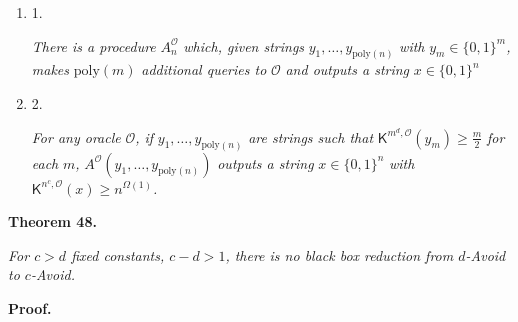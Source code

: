 \begin{enumerate}


\item[] 
1. 


\emph{There is a procedure }$A^{\mathcal{O}}_{n}$\emph{ which, given strings }$y_{1},\ldots,y_{\mathrm{poly}(n)}$\emph{ with }$y_{m}\in\{0,1\}^{m}$\emph{, makes }$\mathrm{poly}(m)$\emph{ additional queries to }$\mathcal{O}$\emph{ and outputs a string }$x\in\{0,1\}^{n}$\emph{}\par





\item[] 
2. 


\emph{For any oracle }$\mathcal{O}$\emph{, if }$y_{1},\ldots,y_{\mathrm{poly}(n)}$\emph{ are strings such that }${\mathsf{K}}^{m^{d},\mathcal{O}}(y_{m})\geq\frac{m}{2}$\emph{ for each }$m$\emph{, }$A^{\mathcal{O}}(y_{1},\ldots,y_{\mathrm{poly}(n)})$\emph{ outputs a string }$x\in\{0,1\}^{n}$\emph{ with }${\mathsf{K}}^{n^{c},\mathcal{O}}(x)\geq n^{\Omega(1)}$\emph{.}\par





\end{enumerate}







\par\medskip\noindent\textbf{
\textbf{Theorem 48}\textbf{.}
}\par



\emph{For $c>d$ fixed constants, $c-d>1$, there is no black box reduction from $d$-Avoid to $c$-Avoid.}\par






\par\medskip\noindent\textbf{Proof.}\par




